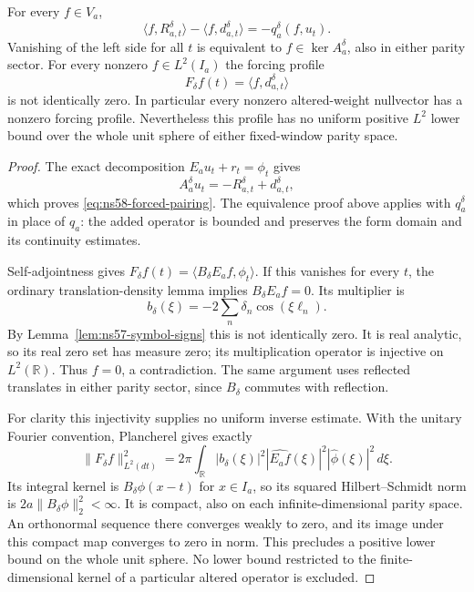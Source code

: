 \begin{proposition}
\label{prop:ns58-forced-pairing}
For every $f\in V_a$,
\begin{equation}\label{eq:ns58-forced-pairing}
 \langle f,R_{a,t}^\delta\rangle-
 \langle f,d_{a,t}^\delta\rangle=-q_a^\delta(f,u_t).
\end{equation}
Vanishing of the left side for all $t$ is equivalent to
$f\in\ker A_a^\delta$, also in either parity sector.
For every nonzero $f\in L^2(I_a)$ the forcing profile
\[
 F_\delta f(t)=\langle f,d_{a,t}^\delta\rangle
\]
is not identically zero. In particular every nonzero altered-weight
nullvector has a nonzero forcing profile. Nevertheless this profile
has no uniform positive $L^2$ lower bound over the whole unit sphere
of either fixed-window parity space.
\end{proposition}
\begin{proof}
The exact decomposition $E_a u_t+r_t=\phi_t$ gives
\[
 A_a^\delta u_t=-R_{a,t}^\delta+d_{a,t}^\delta,
\]
which proves \eqref{eq:ns58-forced-pairing}. The equivalence proof
above applies with $q_a^\delta$ in place of $q_a$: the added operator
is bounded and preserves the form domain and its continuity estimates.

Self-adjointness gives
$F_\delta f(t)=\langle B_\delta E_a f,\phi_t\rangle$.
If this vanishes for every $t$, the ordinary translation-density
lemma implies $B_\delta E_a f=0$. Its multiplier is
\[
 b_\delta(\xi)=-2\sum_n\delta_n\cos(\xi\ell_n).
\]
By Lemma~\ref{lem:ns57-symbol-signs} this is not identically zero.
It is real analytic, so its real zero set has measure zero; its
multiplication operator is injective on $L^2(\mathbb R)$.
Thus $f=0$, a contradiction. The same argument uses reflected
translates in either parity sector, since $B_\delta$ commutes
with reflection.

For clarity this injectivity supplies no uniform inverse estimate.
With the unitary Fourier convention, Plancherel gives exactly
\[
 \|F_\delta f\|_{L^2(dt)}^2
   =2\pi\int_{\mathbb R}|b_\delta(\xi)|^2
                |\widehat{E_a f}(\xi)|^2|\widehat\phi(\xi)|^2\,d\xi.
\]
Its integral kernel is $B_\delta\phi(x-t)$ for $x\in I_a$,
so its squared Hilbert--Schmidt norm is
$2a\|B_\delta\phi\|_2^2<\infty$. It is compact, also on
each infinite-dimensional parity space. An orthonormal sequence
there converges weakly to zero, and its image under this compact
map converges to zero in norm. This precludes a positive lower
bound on the whole unit sphere. No lower bound restricted to the
finite-dimensional kernel of a particular altered operator is excluded.
\end{proof}

